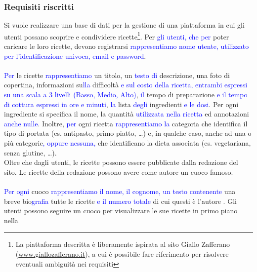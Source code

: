 \documentclass[12pt]{extarticle}
\begin{document}
\subsubsection{Requisiti riscritti}
Si vuole realizzare una base di dati per la gestione di una piattaforma in cui gli utenti possano
scoprire e condividere ricette\footnote{La piattaforma descritta è liberamente ispirata al sito Giallo Zafferano 
(\url{www.giallozafferano.it}), a cui è possibile fare riferimento per risolvere eventuali ambiguità nei requisiti}.
Per \textcolor{blue}{gli utenti, che per} poter caricare le loro ricette,  devono registrarsi 
\textcolor{blue}{rappresentiamo nome utente, utilizzato per l'identificazione univoca, email e password}.
\\\\
\textcolor{blue}{Per} le ricette \textcolor{blue}{rappresentiamo}  un titolo, un \textcolor{blue}{testo di} descrizione, una foto di copertina,  informazioni su\textcolor{blue}{lla} difficoltà
\textcolor{blue}{e sul costo della ricetta, entrambi espressi su una scala a 3 livelli (Basso, Medio, Alto)},
\textcolor{blue}{il} tempo di preparazione \textcolor{blue}{e il tempo di cottura espressi in ore e minuti},  \textcolor{blue}{la} lista  \textcolor{blue}{degli} ingredienti \textcolor{blue}{e le dosi}. 
Per ogni ingrediente si specifica il nome, la quantità \textcolor{blue}{utilizzata nella ricetta} ed  annotazioni \textcolor{blue}{anche nulle}.
Inoltre, \textcolor{blue}{per} ogni ricetta  \textcolor{blue}{rappresentiamo la} categoria che identifica il tipo di portata (es. antipasto, primo piatto, \dots) e, in qualche caso, anche
ad una o più categorie\textcolor{blue}{, oppure nessuna,} che identificano la dieta associata (es. vegetariana, senza glutine, \dots). 
\\
Oltre che dagli utenti, le ricette possono essere pubblicate dalla redazione del sito. Le ricette della
redazione possono avere come autore un cuoco famoso.
\\\\
 \textcolor{blue}{Per ogni} cuoco  
\textcolor{blue}{rappresentiamo il nome, il cognome, un testo contenente} una
breve bio\textcolor{blue}{grafia}  tutte le ricette \textcolor{blue}{e il numero totale} di cui questi è l'autore . Gli utenti possono seguire un cuoco per visualizzare le sue ricette in primo piano nella
\end{document}
